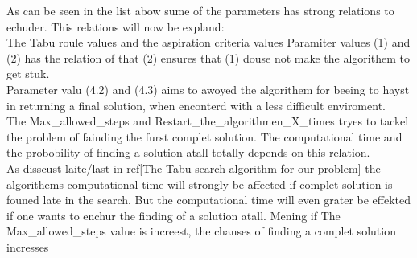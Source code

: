 As can be seen in the list abow sume of the parameters has strong relations to echuder. 
This relations will now be expland:\\
The Tabu roule values and the aspiration criteria values 
Paramiter values (1) and (2) has the relation of that (2) ensures that (1) douse not make the algorithem to get stuk.\\
Parameter valu (4.2) and (4.3) aims to awoyed the algorithem for beeing to hayst in returning a final solution, when enconterd with a less difficult enviroment.\\
The Max\_allowed\_steps and Restart\_the\_algorithmen\_X\_times tryes to tackel the problem of fainding the furst complet solution. The computational time and the probobility of finding a solution atall totally depends on this relation.\\
As disscust laite/last in ref[The Tabu search algorithm for our problem] the algorithems computational time will strongly be affected if complet solution is founed late in the search.
But the computational time will even grater be effekted if one wants to enchur the finding of a solution atall. Mening if The Max\_allowed\_steps value is increest, the chanses of finding a complet solution incresses 

